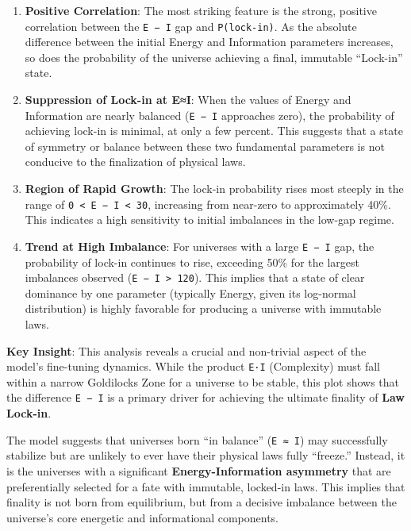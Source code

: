 \begin{enumerate}
\def\labelenumi{\arabic{enumi}.}
\item
  \textbf{Positive Correlation}: The most striking feature is the
  strong, positive correlation between the
  \texttt{\textbar{}E\ −\ I\textbar{}} gap and \texttt{P(lock-in)}. As
  the absolute difference between the initial Energy and Information
  parameters increases, so does the probability of the universe
  achieving a final, immutable ``Lock-in'' state.
\item
  \textbf{Suppression of Lock-in at E≈I}: When the values of Energy and
  Information are nearly balanced (\texttt{\textbar{}E\ −\ I\textbar{}}
  approaches zero), the probability of achieving lock-in is minimal, at
  only a few percent. This suggests that a state of symmetry or balance
  between these two fundamental parameters is not conducive to the
  finalization of physical laws.
\item
  \textbf{Region of Rapid Growth}: The lock-in probability rises most
  steeply in the range of
  \texttt{0\ \textless{}\ \textbar{}E\ −\ I\textbar{}\ \textless{}\ 30},
  increasing from near-zero to approximately 40\%. This indicates a high
  sensitivity to initial imbalances in the low-gap regime.
\item
  \textbf{Trend at High Imbalance}: For universes with a large
  \texttt{\textbar{}E\ −\ I\textbar{}} gap, the probability of lock-in
  continues to rise, exceeding 50\% for the largest imbalances observed
  (\texttt{\textbar{}E\ −\ I\textbar{}\ \textgreater{}\ 120}). This
  implies that a state of clear dominance by one parameter (typically
  Energy, given its log-normal distribution) is highly favorable for
  producing a universe with immutable laws.
\end{enumerate}

\textbf{Key Insight}: This analysis reveals a crucial and non-trivial
aspect of the model's fine-tuning dynamics. While the product
\texttt{E·I} (Complexity) must fall within a narrow Goldilocks Zone for
a universe to be stable, this plot shows that the difference
\texttt{\textbar{}E\ −\ I\textbar{}} is a primary driver for achieving
the ultimate finality of \textbf{Law Lock-in}.

The model suggests that universes born ``in balance'' (\texttt{E\ ≈\ I})
may successfully stabilize but are unlikely to ever have their physical
laws fully ``freeze.'' Instead, it is the universes with a significant
\textbf{Energy-Information asymmetry} that are preferentially selected
for a fate with immutable, locked-in laws. This implies that finality is
not born from equilibrium, but from a decisive imbalance between the
universe's core energetic and informational components.

